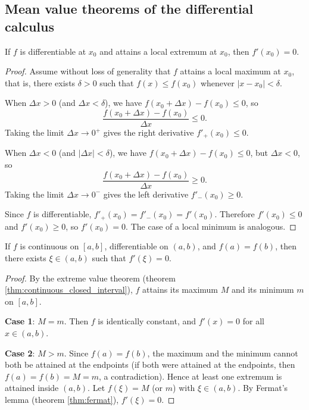 \subsection{\texorpdfstring{Mean value theorems of the differential calculus}{Mean value theorems of the differential calculus}}

\begin{theorem}\label{thm:fermat}
If $f$ is differentiable at $x_0$ and attains a local extremum at $x_0$, then $f'(x_0) = 0$.
\end{theorem}

\begin{proof}
Assume without loss of generality that $f$ attains a local maximum at $x_0$, that is, there exists $\delta > 0$ such that $f(x) \le f(x_0)$ whenever $|x - x_0| < \delta$.

When $\Delta x > 0$ (and $\Delta x < \delta$), we have $f(x_0 + \Delta x) - f(x_0) \le 0$, so
\[
\frac{f(x_0+\Delta x) - f(x_0)}{\Delta x} \le 0.
\]
Taking the limit $\Delta x \to 0^+$ gives the right derivative $f'_+(x_0) \le 0$.

When $\Delta x < 0$ (and $|\Delta x| < \delta$), we have $f(x_0 + \Delta x) - f(x_0) \le 0$, but $\Delta x < 0$, so
\[
\frac{f(x_0+\Delta x) - f(x_0)}{\Delta x} \ge 0.
\]
Taking the limit $\Delta x \to 0^-$ gives the left derivative $f'_-(x_0) \ge 0$.

Since $f$ is differentiable, $f'_+(x_0) = f'_-(x_0) = f'(x_0)$. Therefore $f'(x_0) \le 0$ and $f'(x_0) \ge 0$, so $f'(x_0) = 0$. The case of a local minimum is analogous.
\end{proof}

\begin{theorem}\label{thm:rolle}
If $f$ is continuous on $[a,b]$, differentiable on $(a,b)$, and $f(a) = f(b)$, then there exists $\xi \in (a,b)$ such that $f'(\xi) = 0$.
\end{theorem}

\begin{proof}
By the extreme value theorem (theorem \ref{thm:continuous_closed_interval}), $f$ attains its maximum $M$ and its minimum $m$ on $[a,b]$.

\textbf{Case 1}: $M = m$. Then $f$ is identically constant, and $f'(x) = 0$ for all $x \in (a,b)$.

\textbf{Case 2}: $M > m$. Since $f(a) = f(b)$, the maximum and the minimum cannot both be attained at the endpoints (if both were attained at the endpoints, then $f(a) = f(b) = M = m$, a contradiction). Hence at least one extremum is attained inside $(a,b)$. Let $f(\xi) = M$ (or $m$) with $\xi \in (a,b)$. By Fermat's lemma (theorem \ref{thm:fermat}), $f'(\xi) = 0$.
\end{proof}

